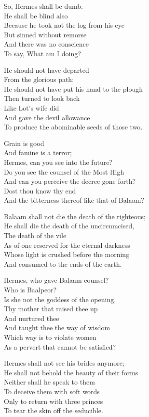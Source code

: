 \documentclass[
]{book}
\begin{document}
So, Hermes shall be dumb.\\
He shall be blind also\\
Because he took not the log from his eye\\
But sinned without remorse\\
And there was no conscience\\
To say, What am I doing?

He should not have departed\\
From the glorious path;\\
He should not have put his hand to the plough\\
Then turned to look back\\
Like Lot's wife did\\
And gave the devil allowance\\
To produce the abominable seeds of those two.

Grain is good\\
And famine is a terror;\\
Hermes, can you see into the future?\\
Do you see the counsel of the Most High\\
And can you perceive the decree gone forth?\\
Dost thou know thy end\\
And the bitterness thereof like that of Balaam?

Balaam shall not die the death of the righteous;\\
He shall die the death of the uncircumcised,\\
The death of the vile\\
As of one reserved for the eternal darkness\\
Whose light is crushed before the morning\\
And consumed to the ends of the earth.

Hermes, who gave Balaam counsel?\\
Who is Baalpeor?\\
Is she not the goddess of the opening,\\
Thy mother that raised thee up\\
And nurtured thee\\
And taught thee the way of wisdom\\
Which way is to violate women\\
As a pervert that cannot be satisfied?

Hermes shall not see his brides anymore;\\
He shall not behold the beauty of their forms\\
Neither shall he speak to them\\
To deceive them with soft words\\
Only to return with three princes\\
To tear the skin off the seducible.
\end{document}
